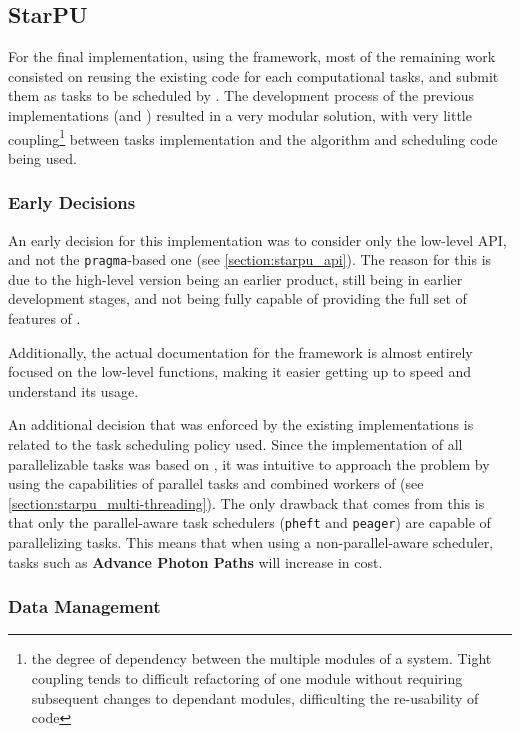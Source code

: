 \documentclass[main.tex]{subfiles}
\begin{document}
\subsection{StarPU} \label{section:impl_starpu}

For the final implementation, using the \starpu framework, most of the remaining work consisted on reusing the existing code for each computational tasks, and submit them as tasks to be scheduled by \starpu. The development process of the previous implementations (\cpu and \cuda) resulted in a very modular solution, with very little coupling\footnote{the degree of dependency between the multiple modules of a system. Tight coupling tends to difficult refactoring of one module without requiring subsequent changes to dependant modules, difficulting the re-usability of code} between tasks implementation and the algorithm and scheduling code being used.

\subsubsection{Early Decisions}

An early decision for this implementation was to consider only the low-level API, and not the \texttt{pragma}-based one (see \cref{section:starpu_api}). The reason for this is due to the high-level version being an earlier product, still being in earlier development stages, and not being fully capable of providing the full set of features of \starpu.

Additionally, the actual documentation for the framework is almost entirely focused on the low-level functions, making it easier getting up to speed and understand its usage.

An additional decision that was enforced by the existing implementations is related to the task scheduling policy used. Since the \cpu implementation of all parallelizable tasks was based on \openmp, it was intuitive to approach the problem by using the capabilities of parallel tasks and combined workers of \starpu (see \cref{section:starpu_multi-threading}). The only drawback that comes from this is that only the parallel-aware task schedulers (\texttt{pheft} and \texttt{peager}) are capable of parallelizing \cpu tasks. This means that when using a non-parallel-aware scheduler, \cpu tasks such as \textbf{Advance Photon Paths} will increase in cost.

\subsubsection{Data Management}
\end{document}
